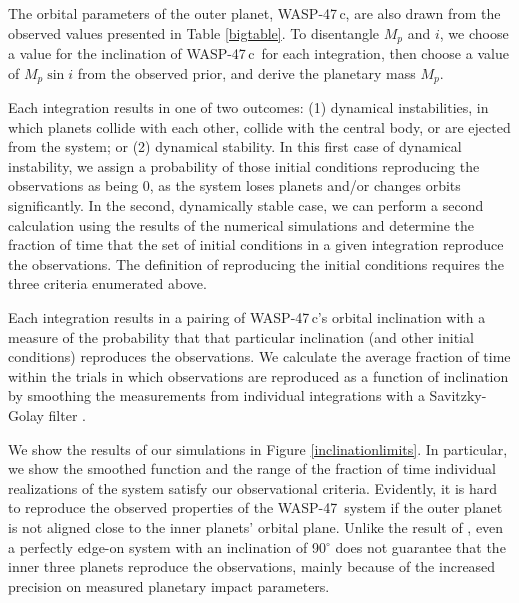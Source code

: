 \documentclass{emulateapj}
\newcommand{\ron}{\color{black}}
\newcommand{\thisstar}{WASP-47}
\newcommand{\thisfirstplanet}{WASP-47\,b}
\newcommand{\thisfourthplanet}{WASP-47\,c}
\begin{document}
The orbital parameters of the outer planet, \thisfourthplanet, are also drawn from the observed values presented in Table \ref{bigtable}. To disentangle $M_{p}$ and $i$, we choose a value for the inclination of \thisfourthplanet\ for each integration, then choose a value of $M_{p} \sin{i}$ from the observed prior, and derive the planetary mass $M_{p}$. 

Each integration results in one of two outcomes: (1) dynamical instabilities, in which planets collide with each other, collide with the central body, or are ejected from the system; or (2) dynamical stability. In this first case of dynamical instability, we assign a probability of those initial conditions reproducing the observations as being 0, as the system loses planets and/or changes orbits significantly. In the second, dynamically stable case, we can perform a second calculation using the results of the numerical simulations and determine the fraction of time that the set of initial conditions in a given integration reproduce the observations. The definition of reproducing the initial conditions requires the three criteria enumerated above.%

Each integration results in a pairing of \thisfourthplanet's orbital inclination with a measure of the probability that that particular inclination (and other initial conditions) reproduces the observations. We calculate the average fraction of time {\ron within the trials} in which observations are reproduced as a function of inclination by smoothing the measurements from individual integrations with a Savitzky-Golay filter \citep[a standard low-pass filter;][]{sgfilter}. 

We show the results of our simulations in Figure \ref{inclinationlimits}. In particular, we show the smoothed function and the range of the fraction of time individual realizations of the system satisfy our observational criteria. Evidently, it is hard to reproduce the observed properties of the \thisstar\ system if the outer planet is not aligned close to the inner planets' orbital plane. Unlike the result of \citet{beckeradams}, even a perfectly edge-on system with an inclination of 90$^{\circ}$ does not guarantee that the inner three planets reproduce the observations, mainly because of the increased precision on measured planetary impact parameters.   
\end{document}
